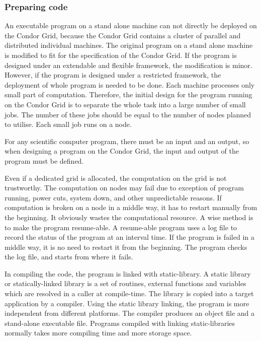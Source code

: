 \subsubsection{Preparing code} An executable program on a stand alone machine can not directly be deployed on the Condor Grid, because the Condor Grid contains a cluster of parallel and distributed individual machines. The original program on a stand alone machine is modified to fit for the specification of the Condor Grid. If the program is designed under an extendable and flexible framework, the modification is minor. However, if the program is designed under a restricted framework, the deployment of whole program is needed to be done. Each machine processes only small part of computation. Therefore, the initial design for the program running on the Condor Grid is to separate the whole task into a large number of small jobs. The number of these jobs should be equal to the number of nodes planned to utilise. Each small job runs on a node.

For any scientific computer program, there must be an input and an output, so when designing a program on the Condor Grid, the input and output of the program must be defined. 

Even if a dedicated grid is allocated, the computation on the grid is not trustworthy. The computation on nodes may fail due to exception of program running, power cuts, system down, and other unpredictable reasons. If computation is broken on a node in a middle way, it has to restart manually from the beginning. It obviously wastes the computational resource. A wise method is to make the program resume-able. A resume-able program uses a log file to record the status of the program at an interval time. If the program is failed in a middle way, it is no need to restart it from the beginning. The program checks the log file, and starts from where it fails.

In compiling the code, the program is linked with static-library. A static library or statically-linked library is a set of routines, external functions and variables which are resolved in a caller at compile-time. The library is copied into a target application by a compiler. Using the static library linking, the program is more independent from different platforms. The compiler produces an object file and a stand-alone executable file. Programs compiled with linking static-libraries normally takes more compiling time and more storage space. 

